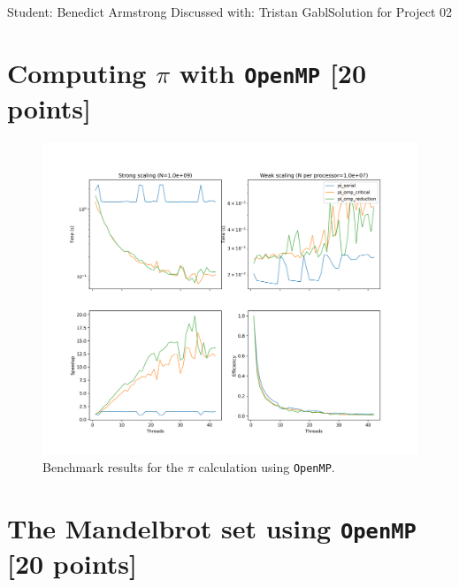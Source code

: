 \documentclass[unicode,11pt,a4paper,oneside,numbers=endperiod,openany]{scrartcl}
\begin{document}
\setassignment
{}

{Student: Benedict Armstrong}
{Discussed with: Tristan Gabl}{Solution for Project 02}{}
\newline

\assignmentpolicy

\section{Computing $\pi$ with \texttt{OpenMP} [20 points]}

\begin{figure}[h]
    \centering
    \includegraphics[width=\textwidth]{../code/pi/benchmark.png}
    \caption{Benchmark results for the $\pi$ calculation using \texttt{OpenMP}.}
    \label{fig:pi_benchmark}
\end{figure}

\section{The Mandelbrot set  using \texttt{OpenMP} [20 points]}
\end{document}
